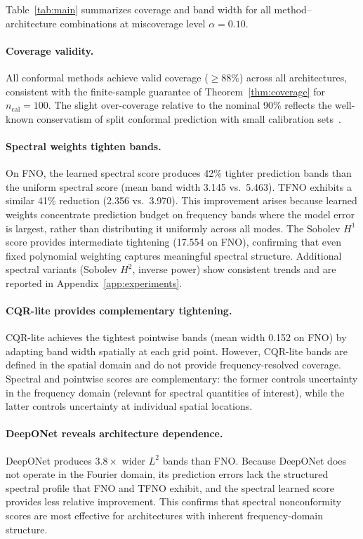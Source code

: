 Table~\ref{tab:main} summarizes coverage and band width for all method--architecture combinations at miscoverage level $\alpha = 0.10$.

\paragraph{Coverage validity.}
All conformal methods achieve valid coverage ($\geq 88\%$) across all architectures, consistent with the finite-sample guarantee of Theorem~\ref{thm:coverage} for $n_{\mathrm{cal}} = 100$. The slight over-coverage relative to the nominal 90\% reflects the well-known conservatism of split conformal prediction with small calibration sets~\citep{vovk2005algorithmic}.

\paragraph{Spectral weights tighten bands.}
On FNO, the learned spectral score produces 42\% tighter prediction bands than the uniform spectral score (mean band width 3.145 vs.\ 5.463). TFNO exhibits a similar 41\% reduction (2.356 vs.\ 3.970). This improvement arises because learned weights concentrate prediction budget on frequency bands where the model error is largest, rather than distributing it uniformly across all modes. The Sobolev $H^1$ score provides intermediate tightening (17.554 on FNO), confirming that even fixed polynomial weighting captures meaningful spectral structure. Additional spectral variants (Sobolev $H^2$, inverse power) show consistent trends and are reported in Appendix~\ref{app:experiments}.

\paragraph{CQR-lite provides complementary tightening.}
CQR-lite achieves the tightest pointwise bands (mean width 0.152 on FNO) by adapting band width spatially at each grid point. However, CQR-lite bands are defined in the spatial domain and do not provide frequency-resolved coverage. Spectral and pointwise scores are complementary: the former controls uncertainty in the frequency domain (relevant for spectral quantities of interest), while the latter controls uncertainty at individual spatial locations.

\paragraph{DeepONet reveals architecture dependence.}
DeepONet produces $3.8\times$ wider $L^2$ bands than FNO. Because DeepONet does not operate in the Fourier domain, its prediction errors lack the structured spectral profile that FNO and TFNO exhibit, and the spectral learned score provides less relative improvement. This confirms that spectral nonconformity scores are most effective for architectures with inherent frequency-domain structure.

